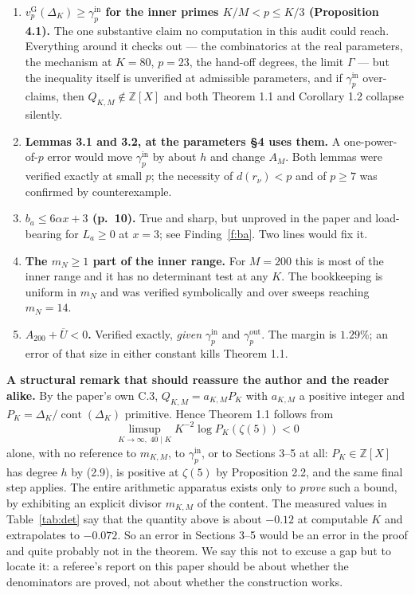 \documentclass[11pt]{article}
\theoremstyle{definition}
\newcommand{\z}{\zeta(5)}
\newcommand{\Ub}{\overline{U}}
\newcommand{\vG}{v_p^{\mathrm{G}}}
\newcommand{\gin}{\gamma_p^{\mathrm{in}}}
\newcommand{\gout}{\gamma_p^{\mathrm{out}}}
\begin{document}
\begin{enumerate}
\item \textbf{$\vG(\Delta_K)\ge\gin$ for the inner primes $K/M<p\le K/3$ (Proposition 4.1).}
The one substantive claim no computation in this audit could reach. Everything around it checks
out --- the combinatorics at the real parameters, the mechanism at $K=80$, $p=23$, the
hand-off degrees, the limit $\Gamma$ --- but the inequality itself is unverified at admissible
parameters, and if $\gin$ over-claims, then $Q_{K,M}\notin\mathbb{Z}[X]$ and both Theorem 1.1
and Corollary 1.2 collapse silently.

\item \textbf{Lemmas 3.1 and 3.2, at the parameters \S4 uses them.} A one-power-of-$p$ error
would move $\gin$ by about $h$ and change $A_M$. Both lemmas were verified exactly at small $p$;
the necessity of $d(r_\nu)<p$ and of $p\ge7$ was confirmed by counterexample.

\item \textbf{$b_a\le6\alpha x+3$ (p.~10).} True and sharp, but unproved in the paper and
load-bearing for $L_a\ge0$ at $x=3$; see Finding~\ref{f:ba}. Two lines would fix it.

\item \textbf{The $m_N\ge1$ part of the inner range.} For $M=200$ this is most of the inner
range and it has no determinant test at any $K$. The bookkeeping is uniform in $m_N$ and was
verified symbolically and over sweeps reaching $m_N=14$.

\item \textbf{$A_{200}+\Ub<0$.} Verified exactly, \emph{given} $\gin$ and $\gout$. The margin is
$1.29\%$; an error of that size in either constant kills Theorem 1.1.
\end{enumerate}

\noindent\textbf{A structural remark that should reassure the author and the reader alike.} By
the paper's own C.3, $Q_{K,M}=a_{K,M}P_K$ with $a_{K,M}$ a positive integer and
$P_K=\Delta_K/\operatorname{cont}(\Delta_K)$ primitive. Hence Theorem 1.1 follows from
\[
\limsup_{K\to\infty,\;40\mid K}K^{-2}\log P_K(\z)<0
\]
alone, with no reference to $m_{K,M}$, to $\gin$, or to Sections 3--5 at all: $P_K\in\mathbb{Z}[X]$
has degree $h$ by (2.9), is positive at $\z$ by Proposition 2.2, and the same final step applies.
The entire arithmetic apparatus exists only to \emph{prove} such a bound, by exhibiting an
explicit divisor $m_{K,M}$ of the content. The measured values in Table~\ref{tab:det} say that
the quantity above is about $-0.12$ at computable $K$ and extrapolates to $-0.072$. So an error
in Sections 3--5 would be an error in the proof and quite probably not in the theorem. We say
this not to excuse a gap but to locate it: a referee's report on this paper should be about
whether the denominators are proved, not about whether the construction works.
\end{document}
